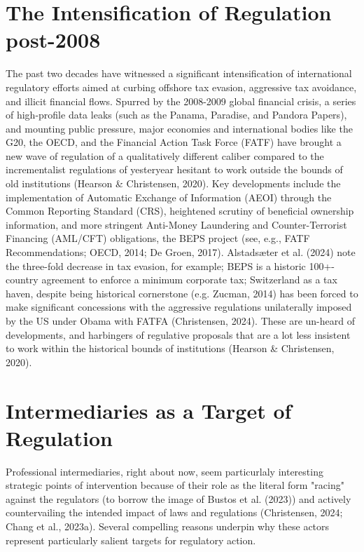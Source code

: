 \section{The Intensification of Regulation post-2008}
\label{sec:1_3}

The past two decades have witnessed a significant intensification of international regulatory efforts aimed at curbing offshore tax evasion, aggressive tax avoidance, and illicit financial flows. Spurred by the 2008-2009 global financial crisis, a series of high-profile data leaks (such as the Panama, Paradise, and Pandora Papers), and mounting public pressure, major economies and international bodies like the G20, the OECD, and the Financial Action Task Force (FATF) have brought a new wave of regulation of a qualitatively different caliber compared to the incrementalist regulations of yesteryear hesitant to work outside the bounds of old institutions (Hearson \& Christensen, 2020). Key developments include the implementation of Automatic Exchange of Information (AEOI) through the Common Reporting Standard (CRS), heightened scrutiny of beneficial ownership information, and more stringent Anti-Money Laundering and Counter-Terrorist Financing (AML/CFT) obligations, the BEPS project (see, e.g., FATF Recommendations; OECD, 2014; De Groen, 2017). Alstadsæter et al. (2024) note the three-fold decrease in tax evasion, for example; BEPS is a historic 100+-country agreement to enforce a minimum corporate tax; Switzerland as a tax haven, despite being historical cornerstone (e.g. Zucman, 2014) has been forced to make significant concessions with the aggressive regulations unilaterally imposed by the US under Obama with FATFA (Christensen, 2024). These are un-heard of developments, and harbingers of regulative proposals that are a lot less insistent to work within the historical bounds of institutions (Hearson \& Christensen, 2020).

\section{Intermediaries as a Target of Regulation}
\label{sec:1_3}

Professional intermediaries, right about now, seem particurlaly interesting strategic points of intervention because of their role as the literal form "racing" against the regulators (to borrow the image of Bustos et al. (2023)) and actively countervailing the intended impact of laws and regulations (Christensen, 2024; Chang et al., 2023a). Several compelling reasons underpin why these actors represent particularly salient targets for regulatory action. 

